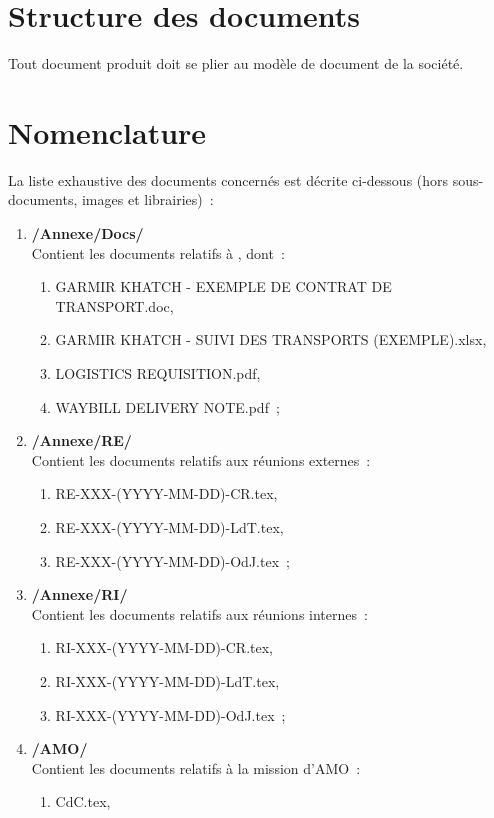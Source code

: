 \documentclass[11pt,fleqn]{report}
\begin{document}
\section{Structure des documents}
Tout document produit doit se plier au modèle de document de la société.

\section{Nomenclature}
La liste exhaustive des documents concernés est décrite ci-dessous (hors sous-documents, images et librairies)~:
\begin{enumerate}
	\item \textbf{/Annexe/Docs/}
	\\
	Contient les documents relatifs à \mo, dont~:
	\begin{enumerate}
		\item GARMIR KHATCH - EXEMPLE DE CONTRAT DE TRANSPORT.doc,
		\item GARMIR KHATCH - SUIVI DES TRANSPORTS (EXEMPLE).xlsx,
		\item LOGISTICS REQUISITION.pdf,
		\item WAYBILL DELIVERY NOTE.pdf~;
	\end{enumerate}
	\item \textbf{/Annexe/RE/}
	\\
	Contient les documents relatifs aux réunions externes~:
	\begin{enumerate}
		\item RE-XXX-(YYYY-MM-DD)-CR.tex,
		\item RE-XXX-(YYYY-MM-DD)-LdT.tex,
		\item RE-XXX-(YYYY-MM-DD)-OdJ.tex~;
	\end{enumerate}
	\item \textbf{/Annexe/RI/}
	\\
	Contient les documents relatifs aux réunions internes~:
	\begin{enumerate}
		\item RI-XXX-(YYYY-MM-DD)-CR.tex,
		\item RI-XXX-(YYYY-MM-DD)-LdT.tex,
		\item RI-XXX-(YYYY-MM-DD)-OdJ.tex~;
	\end{enumerate}
	\item \textbf{/AMO/}
	\\
	Contient les documents relatifs à la mission d'AMO~:
	\begin{enumerate}
		\item CdC.tex,

\end{enumerate}
\end{enumerate}
\end{document}
